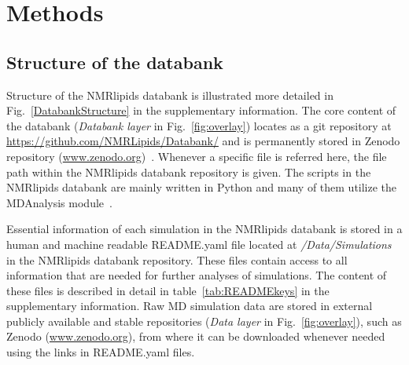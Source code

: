 \documentclass[fleqn,10pt]{wlscirep}
\begin{document}
\newpage


\section{Methods}


\subsection{Structure of the databank}
Structure of the NMRlipids databank is illustrated more detailed in Fig.~\ref{DatabankStructure} in the supplementary information. The core content of the databank ({\it Databank layer} in Fig.~\ref{fig:overlay}) locates as a git repository at \url{https://github.com/NMRLipids/Databank/} and is permanently stored in Zenodo repository (\url{www.zenodo.org})~\cite{??}. Whenever a specific file is referred here, the file path within the NMRlipids databank repository is given. The scripts in the NMRlipids databank are mainly written in Python and many of them utilize the MDAnalysis module~\cite{gowers2019mdanalysis,michaud2011mdanalysis}.

Essential information of each simulation in the NMRlipids databank is stored in a human and machine readable README.yaml file located at {\it /Data/Simulations} in the NMRlipids databank repository. These files contain access to all information that are needed for further analyses of simulations. The content of these files is described in detail in table~\ref{tab:READMEkeys} in the supplementary information. 
Raw MD simulation data are stored in external publicly available and stable repositories ({\it Data layer} in Fig.~\ref{fig:overlay}), such as Zenodo (\url{www.zenodo.org}), from where it can be downloaded whenever needed using the links in README.yaml files.  
\end{document}
